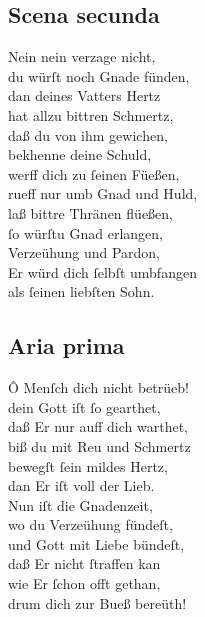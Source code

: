 \documentclass{ees}
\newenvironment{lyrics}[1]{%
  \subsection{#1}\nopagebreak%
  \begin{lyricslist}%
  \let\voice\item%
}{%
  \end{lyricslist}%
}
\newcommand\voiceBarmherzigkeit{\voice[Barmh.]}
\begin{document}
\begin{lyrics}{Scena secunda}
  \voiceBarmherzigkeit
  Nein nein verzage nicht,\\
  du würſt noch Gnade fünden,\\
  dan deines Vatters Hertz\\
  hat allzu bittren Schmertz,\\
  daß du von ihm gewichen,\\
  bekhenne deine Schuld,\\
  werff dich zu ſeinen Füeßen,\\
  rueff nur umb Gnad und Huld,\\
  laß bittre Thränen flüeßen,\\
  ſo würſtu Gnad erlangen,\\
  Verzeühung und Pardon,\\
  Er würd dich ſelbſt umbfangen\\
  als ſeinen liebſten Sohn.
\end{lyrics}

\begin{lyrics}{Aria prima}
  \voiceBarmherzigkeit
  Ô Menſch dich nicht betrüeb!\\
  dein Gott iſt ſo gearthet,\\
  daß Er nur auff dich warthet,\\
  biß du mit Reu und Schmertz\\
  bewegſt ſein mildes Hertz,\\
  dan Er iſt voll der Lieb.\\[1ex]
  Nun iſt die Gnadenzeit,\\
  wo du Verzeühung fündeſt,\\
  und Gott mit Liebe bündeſt,\\
  daß Er nicht ſtraffen kan\\
  wie Er ſchon offt gethan,\\
  drum dich zur Bueß bereüth!
\end{lyrics}
\end{document}
